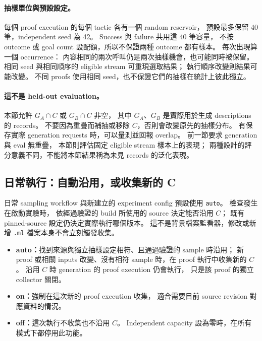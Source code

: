 \paragraph{抽樣單位與預設設定。}
每個 proof execution 的每個 tactic 各有一個 random reservoir，\allowbreak
預設最多保留 40 筆，\allowbreak independent seed 為 42。
Success 與 failure 共用這 40 筆容量，\allowbreak
不按 outcome 或 goal count 設配額，\allowbreak 所以不保證兩種 outcome 都有樣本。
每次出現算一個 occurrence：\allowbreak
內容相同的兩次呼叫仍是兩次抽樣機會，\allowbreak 也可能同時被保留。
相同 seed 與相同順序的 eligible stream 可重現選取結果；\allowbreak
執行順序改變則結果可能改變。
不同 proofs 使用相同 seed，\allowbreak 也不保證它們的抽樣在統計上彼此獨立。

\paragraph{這不是 held-out evaluation。}
本節允許 $G_A\cap C$ 或 $G_B\cap C$ 非空，\allowbreak
其中 $G_A$、$G_B$ 是實際用於生成 descriptions 的 records。
不要因為重疊而補抽或移除 $C$，\allowbreak 否則會改變原先的抽樣分布。
有保存實際 generation requests 時，\allowbreak 可以量測並回報 overlap。
前一節要求 generation 與 eval 無重疊，\allowbreak
本節則評估固定 eligible stream 樣本上的表現；\allowbreak
兩種設計的評分意義不同，\allowbreak 不能將本節結果稱為未見 records 的泛化表現。

\subsection{日常執行：自動沿用，或收集新的 C}

日常 sampling workflow 與新建立的 experiment config 預設使用 \texttt{auto}。
檢查發生在啟動實驗時，\allowbreak
依經過驗證的 build 所使用的 source 決定能否沿用 $C$；\allowbreak
既有 pinned-source 設定仍決定實際執行哪個版本。
這不是背景檔案監看器，\allowbreak 修改或新增 \texttt{.ml} 檔案本身不會立刻觸發收集。

\begin{itemize}
  \item \textbf{auto：}找到來源與獨立抽樣設定相符、且通過驗證的 sample 時沿用；\allowbreak
        新 proof 或相關 inputs 改變、沒有相符 sample 時，\allowbreak 在 proof 執行中收集新的 $C$。
        沿用 $C$ 時 generation 的 proof execution 仍會執行，\allowbreak
        只是該 proof 的獨立 collector 關閉。
  \item \textbf{on：}強制在這次新的 proof execution 收集，\allowbreak
        適合需要目前 source revision 對應資料的情況。
  \item \textbf{off：}這次執行不收集也不沿用 $C$。
        Independent capacity 設為零時，\allowbreak 在所有模式下都停用此功能。
\end{itemize}

